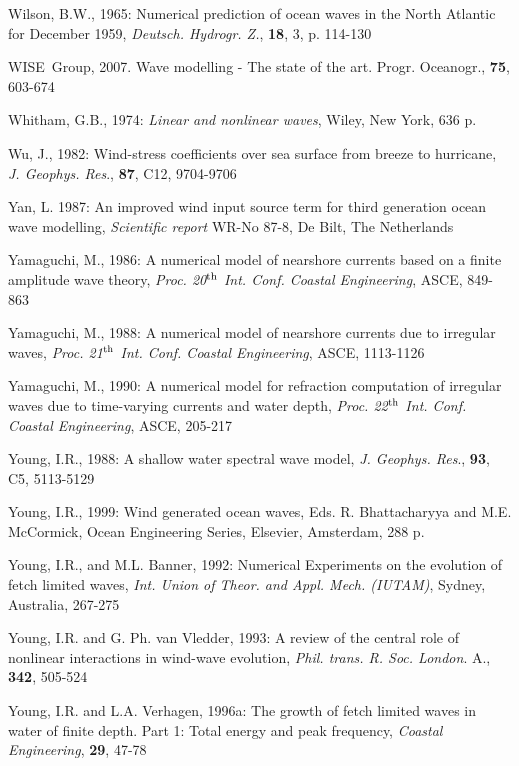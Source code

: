 \documentclass[12pt]{book}
\begin{document}
\begin{thebibliography}{10}
Wilson, B.W., 1965: Numerical prediction of ocean waves in the North Atlantic for December 1959,
{\it Deutsch. Hydrogr. Z.}, {\bf 18}, 3, p. 114-130

WISE~Group, 2007. Wave modelling - The state of the art. Progr. Oceanogr., {\bf 75}, 603-674

Whitham, G.B., 1974: {\it Linear and nonlinear waves}, Wiley, New York, 636 p.

Wu, J., 1982: Wind-stress coefficients over sea surface from breeze to hurricane, {\it J. Geophys. Res}., {\bf 87},
C12, 9704-9706

Yan, L. 1987: An improved wind input source term for third generation ocean wave modelling, {\it Scientific
report} WR-No 87-8, De Bilt, The Netherlands

Yamaguchi, M., 1986: A numerical model of nearshore currents based on a finite amplitude wave theory,
{\it Proc. 20$^{{\rm th}}$ Int. Conf. Coastal Engineering}, ASCE, 849-863

Yamaguchi, M., 1988: A numerical model of nearshore currents due to irregular waves, {\it Proc. 21$^{{\rm th}}$ Int.
Conf. Coastal Engineering}, ASCE, 1113-1126

Yamaguchi, M., 1990: A numerical model for refraction computation of irregular waves due to time-varying
currents and water depth, {\it Proc. 22$^{{\rm th}}$ Int. Conf. Coastal Engineering}, ASCE, 205-217

Young, I.R., 1988: A shallow water spectral wave model, {\it J. Geophys. Res}., {\bf 93}, C5, 5113-5129

Young, I.R., 1999: Wind generated ocean waves, Eds. R. Bhattacharyya and M.E. McCormick, Ocean Engineering Series,
Elsevier, Amsterdam, 288 p.

Young, I.R., and M.L. Banner, 1992: Numerical Experiments on the evolution of fetch limited waves, {\it Int.
Union of Theor. and Appl. Mech. (IUTAM)}, Sydney, Australia, 267-275

Young, I.R. and G. Ph. van Vledder, 1993: A review of the central role of nonlinear interactions in wind-wave evolution,
{\it Phil. trans. R. Soc. London}. A., {\bf 342}, 505-524

Young, I.R. and L.A. Verhagen, 1996a: The growth of fetch limited waves in water of finite depth. Part 1:
Total energy and peak frequency, {\it Coastal Engineering}, {\bf 29}, 47-78


\end{thebibliography}
\end{document}
